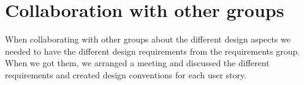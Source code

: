 \section{Collaboration with other groups}
When collaborating with other groups about the different design aspects we needed to have the different design requirements from the requirements group.
When we got them, we arranged a meeting and discussed the different requirements and created design conventions for each user story.